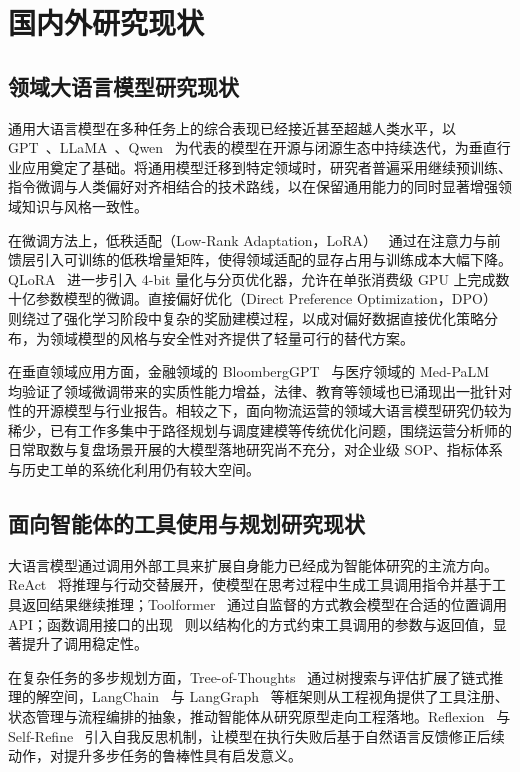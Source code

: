 \chapter{国内外研究现状}

\section{领域大语言模型研究现状}

通用大语言模型在多种任务上的综合表现已经接近甚至超越人类水平，以 GPT~\cite{gpt4}、LLaMA~\cite{llama2}、Qwen~\cite{qwen2_5} 为代表的模型在开源与闭源生态中持续迭代，为垂直行业应用奠定了基础。将通用模型迁移到特定领域时，研究者普遍采用继续预训练、指令微调与人类偏好对齐相结合的技术路线，以在保留通用能力的同时显著增强领域知识与风格一致性。

在微调方法上，低秩适配（Low-Rank Adaptation，LoRA）~\cite{lora} 通过在注意力与前馈层引入可训练的低秩增量矩阵，使得领域适配的显存占用与训练成本大幅下降。QLoRA~\cite{qlora} 进一步引入 4-bit 量化与分页优化器，允许在单张消费级 GPU 上完成数十亿参数模型的微调。直接偏好优化（Direct Preference Optimization，DPO）~\cite{dpo} 则绕过了强化学习阶段中复杂的奖励建模过程，以成对偏好数据直接优化策略分布，为领域模型的风格与安全性对齐提供了轻量可行的替代方案。

在垂直领域应用方面，金融领域的 BloombergGPT~\cite{bloomberggpt} 与医疗领域的 Med-PaLM~\cite{medpalm} 均验证了领域微调带来的实质性能力增益，法律、教育等领域也已涌现出一批针对性的开源模型与行业报告。相较之下，面向物流运营的领域大语言模型研究仍较为稀少，已有工作多集中于路径规划与调度建模等传统优化问题，围绕运营分析师的日常取数与复盘场景开展的大模型落地研究尚不充分，对企业级 SOP、指标体系与历史工单的系统化利用仍有较大空间。

\section{面向智能体的工具使用与规划研究现状}

大语言模型通过调用外部工具来扩展自身能力已经成为智能体研究的主流方向。ReAct~\cite{react} 将推理与行动交替展开，使模型在思考过程中生成工具调用指令并基于工具返回结果继续推理；Toolformer~\cite{toolformer} 通过自监督的方式教会模型在合适的位置调用 API；函数调用接口的出现~\cite{functioncalling} 则以结构化的方式约束工具调用的参数与返回值，显著提升了调用稳定性。

在复杂任务的多步规划方面，Tree-of-Thoughts~\cite{tot} 通过树搜索与评估扩展了链式推理的解空间，LangChain~\cite{langchain} 与 LangGraph~\cite{langgraph} 等框架则从工程视角提供了工具注册、状态管理与流程编排的抽象，推动智能体从研究原型走向工程落地。Reflexion~\cite{reflexion} 与 Self-Refine~\cite{selfrefine} 引入自我反思机制，让模型在执行失败后基于自然语言反馈修正后续动作，对提升多步任务的鲁棒性具有启发意义。

